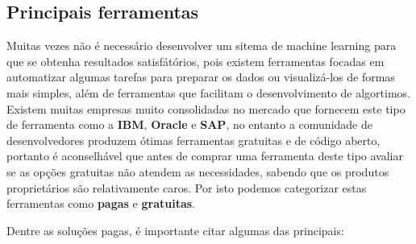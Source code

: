 \subsection{Principais ferramentas}
\label{subsec:ferramentas}
Muitas vezes não é necessário desenvolver um sitema de machine learning para que se obtenha resultados satisfátórios, pois existem
ferramentas focadas em automatizar algumas tarefas para preparar os dados ou visualizá-los de formas mais 
simples, além de ferramentas que facilitam o desenvolvimento de algortimos. Existem muitas empresas muito consolidadas no mercado 
que fornecem este tipo de ferramenta como a \textbf{IBM}, \textbf{Oracle} e \textbf{SAP}, no entanto a comunidade de desenvolvedores
produzem ótimas ferramentas gratuitas e de código aberto, portanto é aconselhável que antes de comprar uma ferramenta deste tipo
avaliar se as opções gratuitas não atendem as necessidades, sabendo que os produtos proprietários são relativamente caros. Por 
isto podemos categorizar estas ferramentas como \textbf{pagas} e \textbf{gratuitas}.


Dentre as soluções pagas, é importante citar algumas das principais:

